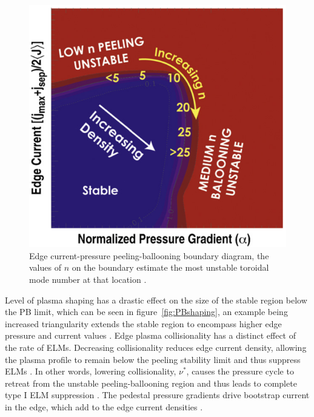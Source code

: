 \documentclass[11pt, twocolumn]{article}  %
\begin{document}
\begin{figure}
\includegraphics[scale=0.5]{Figures/PBmodenumbers.PNG}
\centering
\caption{Edge current-pressure peeling-ballooning boundary diagram, the values of $n$ on the boundary estimate the most unstable toroidal mode number at that location \cite{Wade2009}.}\label{fig:PBmodenumbers}
\end{figure}

Level of plasma shaping has a drastic effect on the size of the stable region below the PB limit, which can be seen in figure~\ref{fig:PBshaping}, an example being increased triangularity extends the stable region to encompass higher edge pressure and current values \cite{Lang2013}. Edge plasma collisionality has a distinct effect of the rate of ELMs. Decreasing collisionality reduces edge current density, allowing the plasma profile to remain below the peeling stability limit and thus suppress ELMs \cite{Kirk2013}. In other words, lowering collisionality, $\nu^{*}$, causes the pressure cycle to retreat from the unstable peeling-ballooning region and thus leads to complete type I ELM suppression \cite{Evans2008}. The pedestal pressure gradients drive bootstrap current in the edge, which add to the edge current densities \cite{Lang2013}.
\end{document}
